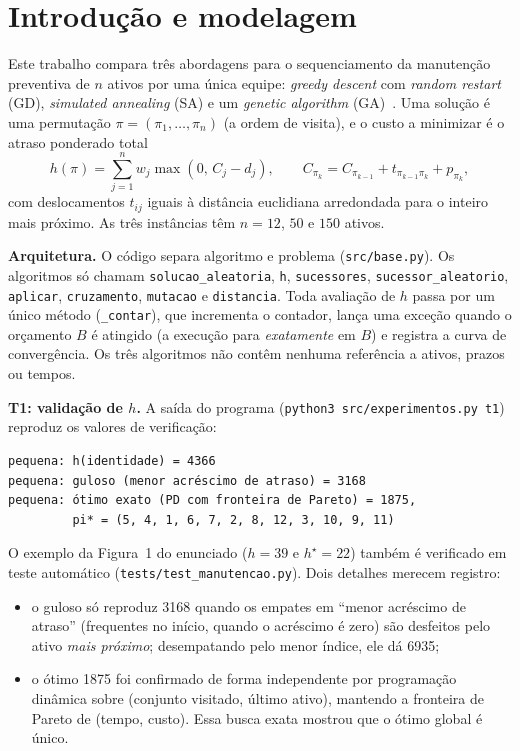 \section{Introdução e modelagem}

Este trabalho compara três abordagens para o sequenciamento da manutenção
preventiva de $n$ ativos por uma única equipe: \textit{greedy descent} com
\textit{random restart} (GD), \textit{simulated annealing} (SA) e um
\textit{genetic algorithm} (GA)~\cite{poole2023,russell2016,eiben2003}. Uma solução é uma permutação
$\pi=(\pi_1,\dots,\pi_n)$ (a ordem de visita), e o custo a minimizar é o atraso
ponderado total
\begin{equation}
h(\pi)=\sum_{j=1}^{n} w_j\max(0,\,C_j-d_j),\qquad
C_{\pi_k}=C_{\pi_{k-1}}+t_{\pi_{k-1}\pi_k}+p_{\pi_k},
\end{equation}
com deslocamentos $t_{ij}$ iguais à distância euclidiana arredondada para o
inteiro mais próximo. As três instâncias têm $n=12$, $50$ e $150$ ativos.

\textbf{Arquitetura.} O código separa algoritmo e problema
(\texttt{src/base.py}). Os algoritmos só chamam \texttt{solucao\_aleatoria},
\texttt{h}, \texttt{sucessores}, \texttt{sucessor\_aleatorio},
\texttt{aplicar}, \texttt{cruzamento}, \texttt{mutacao} e
\texttt{distancia}. Toda avaliação de $h$ passa por um único método
(\texttt{\_contar}), que incrementa o contador, lança uma exceção quando o
orçamento $B$ é atingido (a execução para \emph{exatamente} em $B$) e registra a
curva de convergência. Os três algoritmos não contêm nenhuma referência a
ativos, prazos ou tempos.

\textbf{T1: validação de $h$.} A saída do programa
(\texttt{python3 src/experimentos.py t1}) reproduz os valores de verificação:
\begin{verbatim}
pequena: h(identidade) = 4366
pequena: guloso (menor acréscimo de atraso) = 3168
pequena: ótimo exato (PD com fronteira de Pareto) = 1875,
         pi* = (5, 4, 1, 6, 7, 2, 8, 12, 3, 10, 9, 11)
\end{verbatim}
O exemplo da Figura~1 do enunciado ($h=39$ e $h^\star=22$) também é verificado
em teste automático (\texttt{tests/test\_manutencao.py}). Dois detalhes
merecem registro:
\begin{itemize}
    \item o guloso só reproduz 3168 quando os empates em ``menor acréscimo de
    atraso'' (frequentes no início, quando o acréscimo é zero) são desfeitos
    pelo ativo \emph{mais próximo}; desempatando pelo menor índice, ele dá 6935;
    \item o ótimo 1875 foi confirmado de forma independente por programação
    dinâmica sobre (conjunto visitado, último ativo), mantendo a fronteira de
    Pareto de (tempo, custo). Essa busca exata mostrou que o ótimo global é
    único.
\end{itemize}

